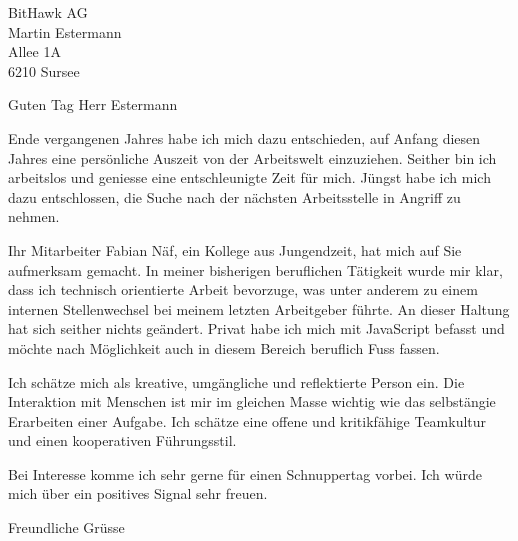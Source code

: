 \documentclass[
	pagenumber=false, 
	parskip=half, 
	fromalign=right, 
	foldmarks=true, 
	addrfield=true 
	]{scrlttr2}
\date{\today}
\begin{document}
\begin{letter}{BitHawk AG \\ Martin Estermann \\ Allee 1A \\ 6210 Sursee} 

\opening{Guten Tag Herr Estermann}

Ende vergangenen Jahres habe ich mich dazu entschieden, auf Anfang diesen Jahres eine persönliche Auszeit von der Arbeitswelt einzuziehen. Seither bin ich arbeitslos und geniesse eine entschleunigte Zeit für mich. Jüngst habe ich mich dazu entschlossen, die Suche nach der nächsten Arbeitsstelle in Angriff zu nehmen.

Ihr Mitarbeiter Fabian Näf, ein Kollege aus Jungendzeit, hat mich auf Sie aufmerksam gemacht. In meiner bisherigen beruflichen Tätigkeit wurde mir klar, dass ich technisch orientierte Arbeit bevorzuge, was unter anderem zu einem internen Stellenwechsel bei meinem letzten Arbeitgeber führte. An dieser Haltung hat sich seither nichts geändert. Privat habe ich mich mit JavaScript befasst und möchte nach Möglichkeit auch in diesem Bereich beruflich Fuss fassen.

Ich schätze mich als kreative, umgängliche und reflektierte Person ein. Die Interaktion mit Menschen ist mir im gleichen Masse wichtig wie das selbstängie Erarbeiten einer Aufgabe. Ich schätze eine offene und kritikfähige Teamkultur und einen kooperativen Führungsstil.

Bei Interesse komme ich sehr gerne für einen Schnuppertag vorbei. Ich würde mich über ein positives Signal sehr freuen. 

\closing{Freundliche Grüsse}


\end{letter}
\end{document}

